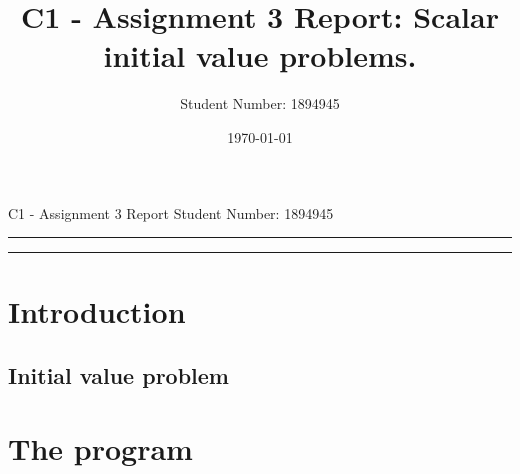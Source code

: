 \documentclass[11pt]{article}
\title{C1 - Assignment 3 Report: Scalar initial value problems.} %
\author{Student Number: 1894945} %
\date{\today} %
\theoremstyle{theorem}
\theoremstyle{definition}
\begin{document}
\maketitle %

\begin{center}
C1 - Assignment 3 Report \hfill
Student Number: 1894945
\vspace{3pt} \hrule \vspace{3pt} \hrule
\end{center}

\tableofcontents

\clearpage



\section{Introduction}

\subsection{Initial value problem}


\section{The program}
\end{document}
